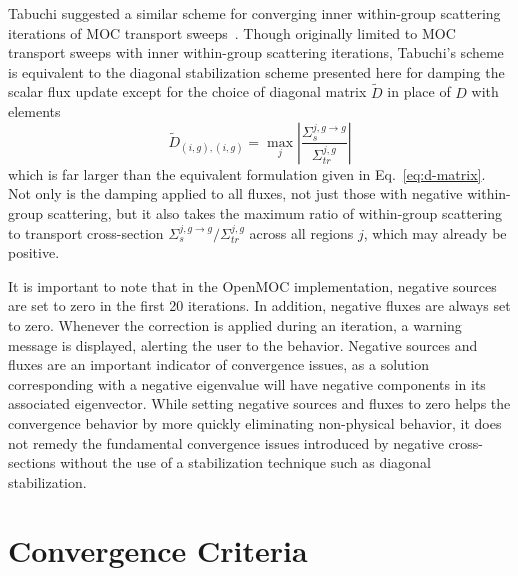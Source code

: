 Tabuchi suggested a similar scheme for converging inner within-group scattering iterations of \ac{MOC} transport sweeps~\cite{ty-solution}. Though originally limited to \ac{MOC} transport sweeps with inner within-group scattering iterations, Tabuchi's scheme is equivalent to the diagonal stabilization scheme presented here for damping the scalar flux update except for the choice of diagonal matrix $\tilde{D}$ in place of $D$ with elements
\begin{equation}
\tilde{D}_{(i,g), (i,g)} = \max_j \left|\frac{\Sigma_{s}^{j, g \rightarrow g}}{\Sigma_{\textit{tr}}^{j, g}} \right|
\end{equation}
which is far larger than the equivalent formulation given in Eq.~\ref{eq:d-matrix}. Not only is the damping applied to all fluxes, not just those with negative within-group scattering, but it also takes the maximum ratio of within-group scattering to transport cross-section $\Sigma_{s}^{j,g \rightarrow g} / \Sigma_{\textit{tr}}^{j, g}$ across all regions $j$, which may already be positive.

It is important to note that in the OpenMOC implementation, negative sources are set to zero in the first 20 iterations. In addition, negative fluxes are always set to zero. Whenever the correction is applied during an iteration, a warning message is displayed, alerting the user to the behavior. Negative sources and fluxes are an important indicator of convergence issues, as a solution corresponding with a negative eigenvalue will have negative components in its associated eigenvector. While setting negative sources and fluxes to zero helps the convergence behavior by more quickly eliminating non-physical behavior, it does not remedy the fundamental convergence issues introduced by negative cross-sections without the use of a stabilization technique such as diagonal stabilization.


\section{Convergence Criteria}
\label{sec:conv-criteria}


